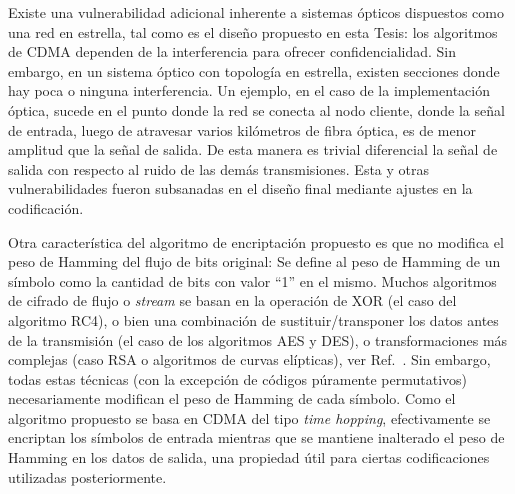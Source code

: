Existe una vulnerabilidad adicional inherente a sistemas ópticos dispuestos como una red en estrella, tal como es el diseño propuesto en esta Tesis: los algoritmos de CDMA dependen de la interferencia para ofrecer confidencialidad. Sin embargo, en un sistema óptico con topología en estrella, existen secciones donde hay poca o ninguna interferencia. Un ejemplo, en el caso de la implementación óptica, sucede en el punto donde la red se conecta al nodo cliente, donde la señal de entrada, luego de atravesar varios kilómetros de fibra óptica, es de menor amplitud que la señal de salida. De esta manera es trivial diferencial la señal de salida con respecto al ruido de las demás transmisiones.   
Esta y otras vulnerabilidades fueron subsanadas en el diseño final mediante ajustes en la codificación.

Otra característica del algoritmo de encriptación propuesto es que no modifica el peso de Hamming del flujo de bits original:
Se define al peso de Hamming de un símbolo como la cantidad de bits con valor ``1'' en el mismo. 
Muchos algoritmos de cifrado de flujo o \textit{stream} se basan en la operación de XOR (el caso del algoritmo RC4), o bien una combinación de sustituir/transponer los datos antes de la transmisión (el caso de los algoritmos AES y DES), o transformaciones más complejas (caso RSA o algoritmos de curvas elípticas), ver Ref.~\cite{Menezes:1996:HAC:548089}.
Sin embargo, todas estas técnicas (con la excepción de códigos púramente permutativos) necesariamente modifican el peso de Hamming de cada símbolo. %
Como el algoritmo propuesto se basa en CDMA del tipo \textit{time hopping}, efectivamente se encriptan los símbolos de entrada mientras que se mantiene inalterado el peso de Hamming en los datos de salida, una propiedad útil para ciertas codificaciones utilizadas posteriormente. %

